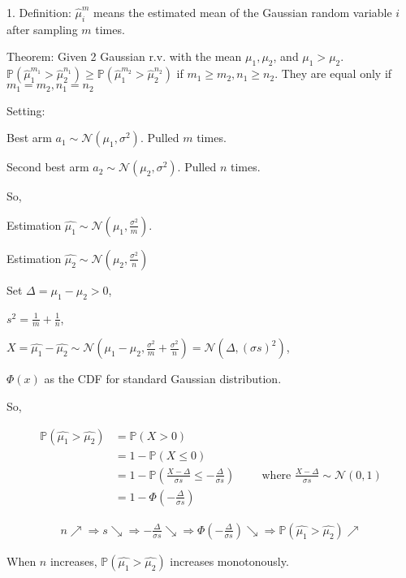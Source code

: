 \documentclass[fleqn]{article}
\def\PP{{\mathbb P}}\def\QQ{{\mathbb Q}}\def\RR{{\mathbb R}}
\begin{document}

1. Definition: $\hat{\mu}_i^m$ means the estimated mean of the Gaussian random variable $i$ after sampling $m$ times.
\medskip

Theorem: Given 2 Gaussian r.v. with the mean $\mu_1, \mu_2$, and $\mu_1 > \mu_2$. $\PP(\hat{\mu}_1^{m_1}>\hat{\mu}_2^{n_1}) \geq \PP(\hat{\mu}_1^{m_2}>\hat{\mu}_2^{n_2})$ if $m_1 \geq m_2, n_1\geq n_2$. They are equal only if $m_1 = m_2, n_1 = n_2$

\medskip

Setting:

Best arm $a_1\sim\mathcal{N}(\mu_1, \sigma^2)$. Pulled $m$ times.

Second best arm $a_2\sim\mathcal{N}(\mu_2, \sigma^2)$. Pulled $n$ times.
\medskip

So,

Estimation $\hat{\mu_1}\sim\mathcal{N}(\mu_1, \frac{\sigma^2}{m})$.

Estimation $\hat{\mu_2}\sim\mathcal{N}(\mu_2, \frac{\sigma^2}{n})$
\medskip

Set $\Delta=\mu_1-\mu_2>0$, 

$s^2=\frac{1}{m}+\frac{1}{n}$,

$X=\hat{\mu_1}-\hat{\mu_2}\sim\mathcal{N}(\mu_1-\mu_2, \frac{\sigma^2}{m}+\frac{\sigma^2}{n})=\mathcal{N}(\Delta, (\sigma s)^2)$,

$\Phi(x)$ as the CDF for standard Gaussian distribution.
\medskip

So, 

\begin{align*}
\PP(\hat{\mu_1}>\hat{\mu_2}) &= \PP(X>0)\\
 &= 1-\PP(X\le 0)\\
 &= 1-\PP(\frac{X-\Delta}{\sigma s}\le -\frac{\Delta}{\sigma s})\hspace{1cm}\text{where $\frac{X-\Delta}{\sigma s}\sim \mathcal{N}(0,1)$}\\
 &=1-\Phi(-\frac{\Delta}{\sigma s})
\end{align*}

\begin{align*} 
n \nearrow \Rightarrow s \searrow \Rightarrow -\frac{\Delta}{\sigma s} \searrow \Rightarrow \Phi(-\frac{\Delta}{\sigma s}) \searrow \Rightarrow \PP(\hat{\mu_1}>\hat{\mu_2}) \nearrow
\end{align*} 

When $n$ increases, $\PP(\hat{\mu_1}>\hat{\mu_2})$ increases monotonously.  
\bigskip
\end{document}
